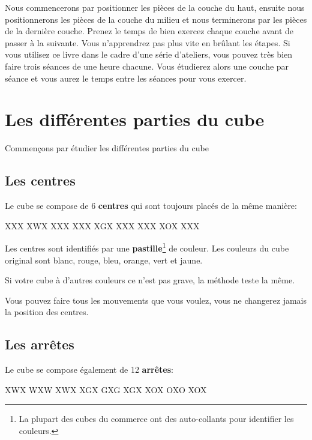 \documentclass[10pt,paper=a5,pagesize]{scrbook}
\begin{document}
Nous commencerons par positionner les pièces de la couche du haut, ensuite nous positionnerons les pièces de la couche du milieu et nous terminerons par les pièces de la dernière
couche. Prenez le temps de bien exercez chaque couche avant de passer
à la suivante. Vous n'apprendrez pas plus vite en brûlant les étapes. Si vous utilisez ce livre dans le cadre d'une série d'ateliers, vous pouvez très bien faire trois
séances de une heure chacune. Vous étudierez alors une couche par séance et vous aurez le temps entre les séances pour vous exercer. 

\chapter{Les différentes parties du cube}

Commençons par étudier les différentes parties du cube

\section{Les centres}

Le cube se compose de 6 \textbf{centres} qui sont toujours placés de la même manière:

\begin{center}
	\RubikFaceUp%
	{X}{X}{X}%
	{X}{W}{X}%
	{X}{X}{X}
	\RubikFaceRight%
	{X}{X}{X}%
	{X}{G}{X}%
	{X}{X}{X}
	\RubikFaceFront%
	{X}{X}{X}%
	{X}{O}{X}%
	{X}{X}{X}
\end{center}

Les centres sont identifiés par une \textbf{pastille}\footnote{La plupart des cubes du commerce ont des auto-collants pour identifier les couleurs.} de couleur. Les
couleurs du cube original sont blanc, rouge, bleu, orange, vert et jaune.

Si votre cube à d'autres couleurs ce n'est pas grave, la méthode teste la
même.

Vous pouvez faire tous les mouvements que vous voulez, vous ne changerez jamais la position des centres.

\section{Les arrêtes}

Le cube se compose également de 12 \textbf{arrêtes}:

\begin{center}
	\RubikFaceUp%
	{X}{W}{X}%
	{W}{X}{W}%
	{X}{W}{X}
	\RubikFaceRight%
	{X}{G}{X}%
	{G}{X}{G}%
	{X}{G}{X}
	\RubikFaceFront%
	{X}{O}{X}%
	{O}{X}{O}%
	{X}{O}{X}
\end{center}
\end{document}
